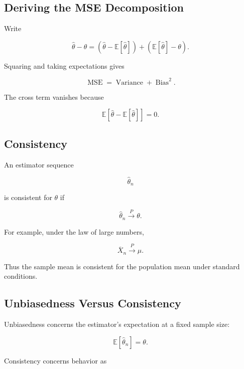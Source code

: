 \subsection{Deriving the MSE Decomposition}
\label{subsec:mse-decomposition}

Write

\[
\widehat{\theta}-\theta
=
\left(
\widehat{\theta}
-
\mathbb{E}[\widehat{\theta}]
\right)
+
\left(
\mathbb{E}[\widehat{\theta}]
-\theta
\right).
\]

Squaring and taking expectations gives

\[
\boxed{
\operatorname{MSE}
=
\operatorname{Variance}
+
\operatorname{Bias}^2.
}
\]

The cross term vanishes because

\[
\mathbb{E}
[
\widehat{\theta}
-
\mathbb{E}[\widehat{\theta}]
]
=
0.
\]

\subsection{Consistency}
\label{subsec:consistency-sampling}

An estimator sequence

\[
\widehat{\theta}_n
\]

is consistent for \(\theta\) if

\[
\boxed{
\widehat{\theta}_n
\xrightarrow{P}
\theta.
}
\]

For example, under the law of large numbers,

\[
\boxed{
\overline{X}_n
\xrightarrow{P}
\mu.
}
\]

Thus the sample mean is consistent for the population mean under standard
conditions.

\subsection{Unbiasedness Versus Consistency}
\label{subsec:unbiasedness-versus-consistency}

Unbiasedness concerns the estimator's expectation at a fixed sample size:

\[
\mathbb{E}[\widehat{\theta}_n]=\theta.
\]

Consistency concerns behavior as

